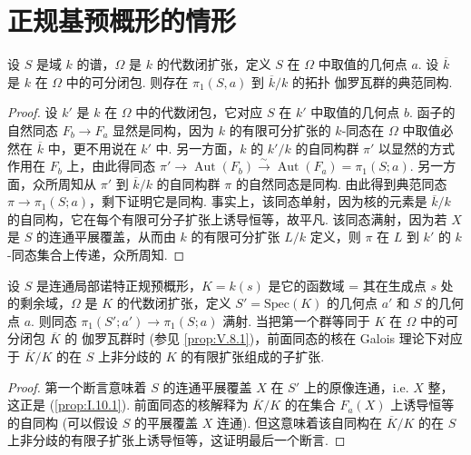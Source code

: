 \section{正规基预概形的情形}

\begin{proposition}\label{prop:V.8.1}
设 $S$ 是域 $k$ 的谱，$\Omega$ 是 $k$ 的代数闭扩张，定义 $S$ 在 $\Omega$ 中取值的几何点 $a$. 设 $\overline{k}$ 是 $k$ 在 $\Omega$ 中的可分闭包. 则存在 $\pi_1(S, a)$ 到 $\overline{k}/k$ 的拓扑 伽罗瓦群的典范同构.
\end{proposition}

\begin{proof}
设 $k'$ 是 $k$ 在 $\Omega$ 中的代数闭包，它对应 $S$ 在 $k'$ 中取值的几何点 $b$. 函子的自然同态 $F_b \to F_a$ 显然是同构，因为 $k$ 的有限可分扩张的 $k$-同态在 $\Omega$ 中取值必然在 $\overline{k}$ 中，更不用说在 $k'$ 中. 另一方面，$k$ 的 $k'/k$ 的自同构群 $\pi'$ 以显然的方式作用在 $F_b$ 上，由此得同态 $\pi' \to \operatorname{Aut}(F_b) \stackrel{\sim}{\longrightarrow} \operatorname{Aut}(F_a) = \pi_1(S; a)$. 另一方面，众所周知从 $\pi'$ 到 $\overline{k}/k$ 的自同构群 $\pi$ 的自然同态是同构. 由此得到典范同态 $\pi \to \pi_1(S; a)$，剩下证明它是同构. 事实上，该同态单射，因为核的元素是 $\overline{k}/k$ 的自同构，它在每个有限可分子扩张上诱导恒等，故平凡. 该同态满射，因为若 $X$ 是 $S$ 的连通平展覆盖，从而由 $k$ 的有限可分扩张 $L/k$ 定义，则 $\pi$ 在 $L$ 到 $k'$ 的 $k$-同态集合上传递，众所周知.
\end{proof}

\begin{proposition}\label{prop:V.8.2}
设 $S$ 是连通局部诺特正规预概形，$K = k(s)$ 是它的函数域 = 其在生成点 $s$ 处的剩余域，$\Omega$ 是 $K$ 的代数闭扩张，定义 $S' = \mathrm{Spec}(K)$ 的几何点 $a'$ 和 $S$ 的几何点 $a$. 则同态 $\pi_1(S'; a') \longrightarrow \pi_1(S; a)$ 满射. 当把第一个群等同于 $K$ 在 $\Omega$ 中的可分闭包 $\overline{K}$ 的 伽罗瓦群时 (参见 \ref{prop:V.8.1})，前面同态的核在 Galois 理论下对应于 $\overline{K}/K$ 的在 $S$ 上非分歧的 $K$ 的有限扩张组成的子扩张.
\end{proposition}

\begin{proof}
第一个断言意味着 $S$ 的连通平展覆盖 $X$ 在 $S'$ 上的原像连通，i.e. $X$ 整，这正是 (\ref{prop:I.10.1}). 前面同态的核解释为 $\overline{K}/K$ 的在集合 $F_a(X)$ 上诱导恒等的自同构 (可以假设 $S$ 的平展覆盖 $X$ 连通). 但这意味着该自同构在 $\overline{K}/K$ 的在 $S$ 上非分歧的有限子扩张上诱导恒等，这证明最后一个断言.
\end{proof}


